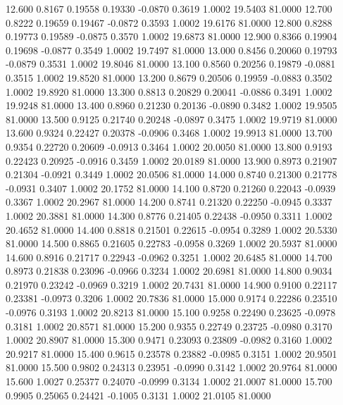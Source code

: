  12.600   0.8167   0.19558   0.19330  -0.0870   0.3619   1.0002  19.5403  81.0000
  12.700   0.8222   0.19659   0.19467  -0.0872   0.3593   1.0002  19.6176  81.0000
  12.800   0.8288   0.19773   0.19589  -0.0875   0.3570   1.0002  19.6873  81.0000
  12.900   0.8366   0.19904   0.19698  -0.0877   0.3549   1.0002  19.7497  81.0000
  13.000   0.8456   0.20060   0.19793  -0.0879   0.3531   1.0002  19.8046  81.0000
  13.100   0.8560   0.20256   0.19879  -0.0881   0.3515   1.0002  19.8520  81.0000
  13.200   0.8679   0.20506   0.19959  -0.0883   0.3502   1.0002  19.8920  81.0000
  13.300   0.8813   0.20829   0.20041  -0.0886   0.3491   1.0002  19.9248  81.0000
  13.400   0.8960   0.21230   0.20136  -0.0890   0.3482   1.0002  19.9505  81.0000
  13.500   0.9125   0.21740   0.20248  -0.0897   0.3475   1.0002  19.9719  81.0000
  13.600   0.9324   0.22427   0.20378  -0.0906   0.3468   1.0002  19.9913  81.0000
  13.700   0.9354   0.22720   0.20609  -0.0913   0.3464   1.0002  20.0050  81.0000
  13.800   0.9193   0.22423   0.20925  -0.0916   0.3459   1.0002  20.0189  81.0000
  13.900   0.8973   0.21907   0.21304  -0.0921   0.3449   1.0002  20.0506  81.0000
  14.000   0.8740   0.21300   0.21778  -0.0931   0.3407   1.0002  20.1752  81.0000
  14.100   0.8720   0.21260   0.22043  -0.0939   0.3367   1.0002  20.2967  81.0000
  14.200   0.8741   0.21320   0.22250  -0.0945   0.3337   1.0002  20.3881  81.0000
  14.300   0.8776   0.21405   0.22438  -0.0950   0.3311   1.0002  20.4652  81.0000
  14.400   0.8818   0.21501   0.22615  -0.0954   0.3289   1.0002  20.5330  81.0000
  14.500   0.8865   0.21605   0.22783  -0.0958   0.3269   1.0002  20.5937  81.0000
  14.600   0.8916   0.21717   0.22943  -0.0962   0.3251   1.0002  20.6485  81.0000
  14.700   0.8973   0.21838   0.23096  -0.0966   0.3234   1.0002  20.6981  81.0000
  14.800   0.9034   0.21970   0.23242  -0.0969   0.3219   1.0002  20.7431  81.0000
  14.900   0.9100   0.22117   0.23381  -0.0973   0.3206   1.0002  20.7836  81.0000
  15.000   0.9174   0.22286   0.23510  -0.0976   0.3193   1.0002  20.8213  81.0000
  15.100   0.9258   0.22490   0.23625  -0.0978   0.3181   1.0002  20.8571  81.0000
  15.200   0.9355   0.22749   0.23725  -0.0980   0.3170   1.0002  20.8907  81.0000
  15.300   0.9471   0.23093   0.23809  -0.0982   0.3160   1.0002  20.9217  81.0000
  15.400   0.9615   0.23578   0.23882  -0.0985   0.3151   1.0002  20.9501  81.0000
  15.500   0.9802   0.24313   0.23951  -0.0990   0.3142   1.0002  20.9764  81.0000
  15.600   1.0027   0.25377   0.24070  -0.0999   0.3134   1.0002  21.0007  81.0000
  15.700   0.9905   0.25065   0.24421  -0.1005   0.3131   1.0002  21.0105  81.0000
